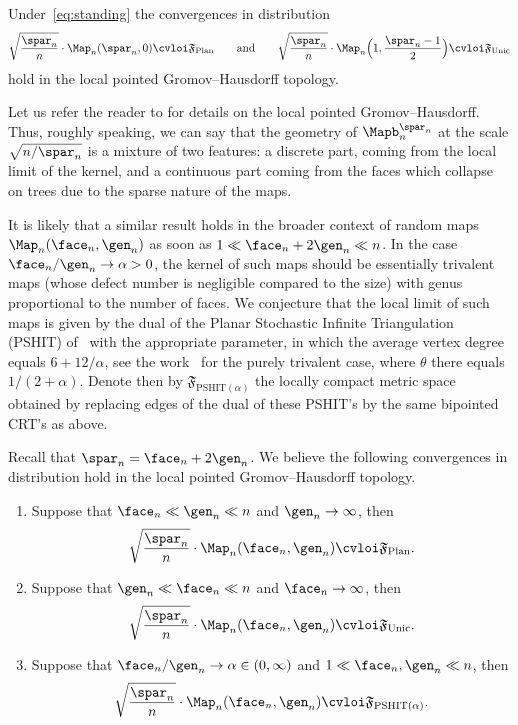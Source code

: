\begin{theorem}
\label{thm:intermediate}
Under~\eqref{eq:standing} the convergences in distribution
\[
\sqrt{ \frac{\spar_{n}}{n}} \cdot \Map_{n}(\spar_{n},0) \cvloi \mathfrak{F}_{ \mathrm{Plan}}
\qquad \text{and} \qquad
\sqrt{ \frac{\spar_{n}}{n}} \cdot \Map_{n}\Bigl(1,\frac{\spar_{n}-1}{2} \Bigr) \cvloi \mathfrak{F}_{ \mathrm{Unic}}
\]
hold in the local pointed Gromov--Hausdorff topology.
\end{theorem}

Let us refer the reader to \eg \cite{BBI01,CLG14,BMR19} for details on the local pointed Gromov--Hausdorff. Thus, roughly speaking, we can say that the geometry of $ \Mapb_n^{\spar_n}$ at the scale $ \sqrt{n/\spar_n}$ is a mixture of two features: a discrete part, coming from the local limit of the kernel, and a continuous part coming from the faces which collapse on trees due to the sparse nature of the maps.

It is likely that a similar result holds in the broader context of random maps $\Map_n(\face_n, \gen_n)$ as soon as
$1 \ll \face_n+2 \gen_n \ll n$.
In the case $\face_n/\gen_n \rightarrow \alpha>0$, the kernel of such maps should be essentially trivalent maps (\ie whose defect number is negligible compared to the size) with genus proportional to the number of faces. We conjecture that the local limit of such maps is given by the dual of the Planar Stochastic Infinite Triangulation (PSHIT) of~\cite{Cur16} with the appropriate parameter, in which the average vertex degree equals $6+12/\alpha$, see the work~\cite{BL21} for the purely trivalent case, where $\theta$ there equals $1/(2+\alpha)$. Denote then by $\mathfrak{F}_{ \mathrm{PSHIT}(\alpha)}$ the locally compact metric space obtained by replacing edges of the dual of these PSHIT's by the same bipointed CRT's as above.

\begin{conjecture}\label{conjecture:general_thm}
Recall that $\spar_{n} = \face_n+2 \gen_n$.
We believe the following convergences in distribution hold in the local pointed Gromov--Hausdorff topology.
\begin{enumerate}
\item Suppose that $\face_n \ll \gen_n \ll n$ and $\gen_n \to \infty$, then
\[
\sqrt{ \frac{\spar_{n}}{n}} \cdot \Map_{n}(\face_n, \gen_n) \cvloi \mathfrak{F}_{ \mathrm{Plan}}.
\]

\item Suppose that $\gen_n \ll \face_n \ll n$ and $\face_n \to \infty$, then
\[
\sqrt{ \frac{\spar_{n}}{n}} \cdot \Map_{n}(\face_n, \gen_n) \cvloi \mathfrak{F}_{ \mathrm{Unic}}.
\]

\item Suppose that $\face_n/\gen_n \rightarrow \alpha \in (0,\infty)$ and $1 \ll \face_n,\gen_n \ll n$, then
\[
\sqrt{ \frac{\spar_{n}}{n}} \cdot \Map_{n}(\face_n, \gen_n) \cvloi \mathfrak{F}_{ \mathrm{PSHIT}(\alpha)}.
\]
\end{enumerate}
\end{conjecture}

